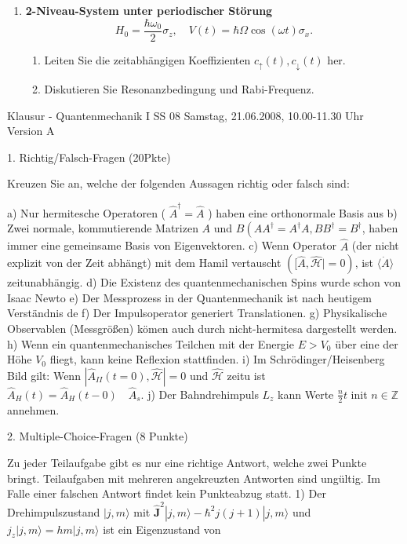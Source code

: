 \documentclass[11pt,a4paper]{article}
\begin{document}
\begin{enumerate}
\item \textbf{2-Niveau-System unter periodischer Störung}\\
\[
H_0=\frac{\hbar\omega_0}{2}\sigma_z,\quad V(t)=\hbar\Omega\cos(\omega t)\sigma_x.
\]
\begin{enumerate}
  \item Leiten Sie die zeitabhängigen Koeffizienten $c_\uparrow(t),c_\downarrow(t)$ her.
  \item Diskutieren Sie Resonanzbedingung und Rabi-Frequenz.
\end{enumerate}

\end{enumerate}




\pagebreak



Klausur - Quantenmechanik I SS 08
Samstag, 21.06.2008, 10.00-11.30 Uhr
Version A

1. Richtig/Falsch-Fragen (20Pkte)

Kreuzen Sie an, welche der folgenden Aussagen richtig oder falsch sind:


a) Nur hermitesche Operatoren ( $\hat{A}^{\dagger}=\hat{A}$ ) haben eine orthonormale Basis aus
b) Zwei normale, kommutierende Matrizen $A$ und $B\left(A A^{\dagger}=A^{\dagger} A, B B^{\dagger}=B^{\dagger}\right.$, haben immer eine gemeinsame Basis von Eigenvektoren.
c) Wenn Operator $\hat{A}$ (der nicht explizit von der Zeit abhängt) mit dem Hamil vertauscht $([\hat{A}, \hat{\mathcal{H}} \mid=0)$, ist $\langle\dot{A}\rangle$ zeitunabhängig.
d) Die Existenz des quantenmechanischen Spins wurde schon von Isaac Newto
e) Der Messprozess in der Quantenmechanik ist nach heutigem Verständnis de
f) Der Impulsoperator generiert Translationen.
g) Physikalische Observablen (Messgrößen) kömen auch durch nicht-hermitesa dargestellt werden.
h) Wenn ein quantenmechanisches Teilchen mit der Energie $E>V_0$ über eine der Höhe $V_0$ fliegt, kann keine Reflexion stattfinden.
i) Im Schrödinger/Heisenberg Bild gilt: Wenn $\left|\hat{A}_{I I}(t=0), \hat{\mathcal{H}}\right|=0$ und $\hat{\mathcal{H}}$ zeitu ist $\hat{A}_H(t)=\hat{A}_H(t-0) \quad \hat{A}_s$.
j) Der Bahndrehimpuls $L_z$ kann Werte $\frac{n}{2} t$ init $n \in \mathbb{Z}$ annehmen.



2. Multiple-Choice-Fragen (8 Punkte)

Zu jeder Teilaufgabe gibt es nur eine richtige Antwort, welche zwei Punkte bringt. Teilaufgaben mit mehreren angekreuzten Antworten sind ungültig. Im Falle einer falschen Antwort findet kein Punkteabzug statt.
1) Der Drehimpulszustand $|j, m\rangle$ mit $\hat{\mathbf{J}}^2|j, m\rangle-\hbar^2 j(j+1)|j, m\rangle$ und $j_z|j, m\rangle=h m|j, m\rangle$ ist ein Eigenzustand von
\end{document}
